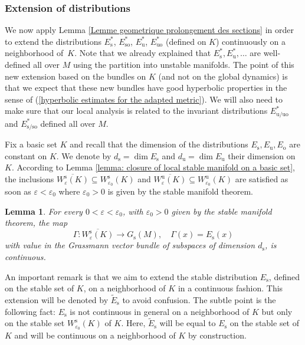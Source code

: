 \documentclass[JEP,XML,SOM,Unicode,NoEqCountersInSection,NoFloatCountersInSection,published]{cedram}
\newcommand{\ro}{\mathrm{o}}
\newcommand{\rs}{\mathrm{s}}
\newcommand{\rso}{\mathrm{so}}
\newcommand{\ru}{\mathrm{u}}
\newcommand{\ruo}{\mathrm{uo}}
\theoremstyle{definition}
\theoremstyle{plain}
\newtheorem{lemma}[definition]{Lemma}
\begin{document}
\subsubsection{Extension of distributions} We now apply Lemma \ref{Lemme geometrique prolongement des sections} in order to extend the distributions $E_{\rs}^*$, $E_{\rso}^*$, $E_{\ru}^*$, $E_{\ruo}^*$ (defined on $K$) continuously on a neighborhood of~$K$. Note that we already explained that $E_\rs^*, E_\ru^*,\dots$ are well-defined all over $M$ using the partition into unstable manifolds. The point of this new extension based on the bundles on $K$ (and not on the global dynamics) is that we expect that these new bundles have good hyperbolic properties in the sense of (\ref{hyperbolic estimates for the adapted metric}). We will also need to make sure that our local analysis is related to the invariant distributions $E_{\ru/\ruo}^*$ and $E_{\rs/\rso}^*$ defined all over $M$.

Fix a basic set $K$ and recall that the dimension of the distributions $E_\rs, E_\ru, E_\ro$ are constant on $K$. We denote by $d_{\rs} = \dim E_\rs$ and $d_{\ru} = \dim E_\ru$ their dimension on $K$. According to Lemma \ref{lemma: closure of local stable manifold on a basic set}, the inclusions $\overline{W_{\varepsilon}^\rs (K)} \subseteq W_{\varepsilon_0}^\rs (K)$ and $\overline{W_{\varepsilon}^\ru (K)} \subseteq W_{\varepsilon_0}^\ru (K)$ are satisfied as soon as $\varepsilon < \varepsilon_0$ where $\varepsilon_0 > 0$ is given by the stable manifold theorem.

\begin{lemma}\label{lemma: continuity of extension of distributions}For every $0 < \varepsilon < \varepsilon_0$, with $\varepsilon_0 > 0$ given by the stable manifold theorem, the map
\[
\Gamma: \overline{W_{\varepsilon}^{\rs} (K)} \to G_{\rs}(M), \quad \Gamma(x) = E_\rs (x)
\]
with value in the Grassmann vector bundle of subspaces of dimension $d_{\rs}$, is continuous.
\end{lemma}

An important remark is that we aim to extend the stable distribution $E_\rs$, defined on the stable set of $K$, on a neighborhood of $K$ in a continuous fashion. This extension will be denoted by $\widetilde{E}_\rs$ to avoid confusion. The subtle point is the following fact: $E_\rs$ is not continuous in general on a neighborhood of $K$ but only on the stable set $W_{\varepsilon_0}^\rs (K)$ of $K$. Here, $\widetilde{E}_\rs$ will be equal to $E_\rs$ on the stable set of $K$ and will be continuous on a neighborhood of $K$ by construction.
\end{document}
